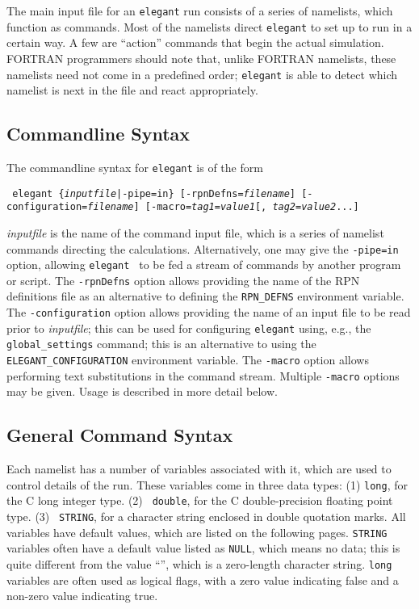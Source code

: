 \documentclass[11pt]{article}
\begin{document}
The main input file for an {\tt elegant} run consists of a series of
namelists, which function as commands.  Most of the namelists direct
{\tt elegant} to set up to run in a certain way.  A few are ``action''
commands that begin the actual simulation.  FORTRAN programmers should
note that, unlike FORTRAN namelists, these namelists need not come in
a predefined order; {\tt elegant} is able to detect which namelist is
next in the file and react appropriately.

\subsection{Commandline Syntax}

The commandline syntax for {\tt elegant} is of the form
\begin{flushleft}{\tt
elegant \{{\em inputfile}|-pipe=in\} [-rpnDefns={\em filename}] [-configuration={\em filename}] [-macro={\em tag1}={\em value1}[,{\em
tag2}={\em value2}...] }\end{flushleft} 
{\em inputfile} is the name of the command input file, which is a series of
namelist commands directing the calculations.
Alternatively, one may give the \verb|-pipe=in| option, allowing {\tt elegant } to be
fed a stream of commands by another program or script.
The \verb|-rpnDefns| option allows providing the name of the RPN definitions file as an alternative
to defining the \verb|RPN_DEFNS| environment variable.
The \verb|-configuration| option allows providing the name of an input file to be read prior to {\em inputfile};
this can be used for configuring \verb|elegant| using, e.g., the \verb|global_settings| command; this is
an alternative to using the \verb|ELEGANT_CONFIGURATION| environment variable.
The \verb|-macro| option allows performing text substitutions in the command stream.
Multiple \verb|-macro| options may be given.
Usage is described in more detail below.

\subsection{General Command Syntax}\label{sect:generalCommandSyntax}

Each namelist has a number of variables associated with it, which are
used to control details of the run.  These variables come in three
data types: (1) {\tt long}, for the C long integer type.  (2) {\tt
double}, for the C double-precision floating point type. (3) {\tt
STRING}, for a character string enclosed in double quotation marks.
All variables have default values, which are listed on the following
pages.  {\tt STRING} variables often have a default value listed as
{\tt NULL}, which means no data; this is quite different from the
value ``'', which is a zero-length character string.  {\tt long}
variables are often used as logical flags, with a zero value
indicating false and a non-zero value indicating true.
\end{document}
